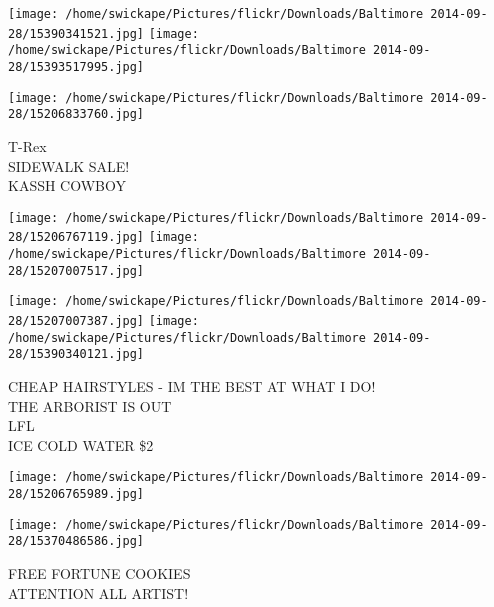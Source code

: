 \documentclass[10pt,letterpaper]{article}
\begin{document}
\texttt{[image: /home/swickape/Pictures/flickr/Downloads/Baltimore 2014-09-28/15390341521.jpg]}
\texttt{[image: /home/swickape/Pictures/flickr/Downloads/Baltimore 2014-09-28/15393517995.jpg]}

\vspace{0.25in}
\texttt{[image: /home/swickape/Pictures/flickr/Downloads/Baltimore 2014-09-28/15206833760.jpg]}

T{-}Rex\\
SIDEWALK SALE!\\
KASSH COWBOY\\
\pagebreak

\texttt{[image: /home/swickape/Pictures/flickr/Downloads/Baltimore 2014-09-28/15206767119.jpg]}
\texttt{[image: /home/swickape/Pictures/flickr/Downloads/Baltimore 2014-09-28/15207007517.jpg]}

\texttt{[image: /home/swickape/Pictures/flickr/Downloads/Baltimore 2014-09-28/15207007387.jpg]}
\texttt{[image: /home/swickape/Pictures/flickr/Downloads/Baltimore 2014-09-28/15390340121.jpg]}

CHEAP HAIRSTYLES {-} IM THE BEST AT WHAT I DO!\\
THE ARBORIST IS OUT\\
LFL\\
ICE COLD WATER \$2\\
\pagebreak

\texttt{[image: /home/swickape/Pictures/flickr/Downloads/Baltimore 2014-09-28/15206765989.jpg]}

\vspace{0.25in}
\texttt{[image: /home/swickape/Pictures/flickr/Downloads/Baltimore 2014-09-28/15370486586.jpg]}

FREE FORTUNE COOKIES\\
ATTENTION ALL ARTIST!\\
\pagebreak
\end{document}
